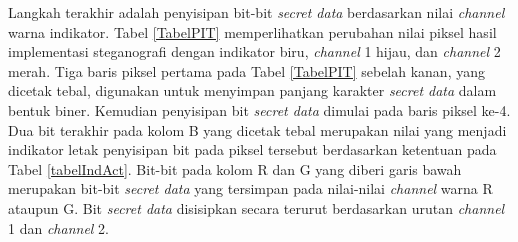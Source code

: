 \documentclass[a4paper,twoside]{article}
\begin{document}
\begin{enumerate}
\begin{itemize}
		Langkah terakhir adalah penyisipan bit-bit \textit{secret data} berdasarkan nilai \textit{channel} warna indikator. Tabel \ref{TabelPIT} memperlihatkan perubahan nilai piksel hasil implementasi steganografi dengan indikator biru, \textit{channel} 1 hijau, dan \textit{channel} 2 merah. Tiga baris piksel pertama pada Tabel \ref{TabelPIT} sebelah kanan, yang dicetak tebal, digunakan untuk menyimpan panjang karakter \textit{secret data} dalam bentuk biner. Kemudian penyisipan bit \textit{secret data} dimulai pada baris piksel ke-4. Dua bit terakhir pada kolom B yang dicetak tebal merupakan nilai yang menjadi indikator letak penyisipan bit pada piksel tersebut berdasarkan ketentuan pada Tabel \ref{tabelIndAct}. Bit-bit pada kolom R dan G yang diberi garis bawah merupakan bit-bit \textit{secret data} yang tersimpan pada nilai-nilai \textit{channel} warna R ataupun G. Bit \textit{secret data} disisipkan secara terurut berdasarkan urutan \textit{channel} 1 dan \textit{channel} 2.\\
		

\end{itemize}
\end{enumerate}
\end{document}
